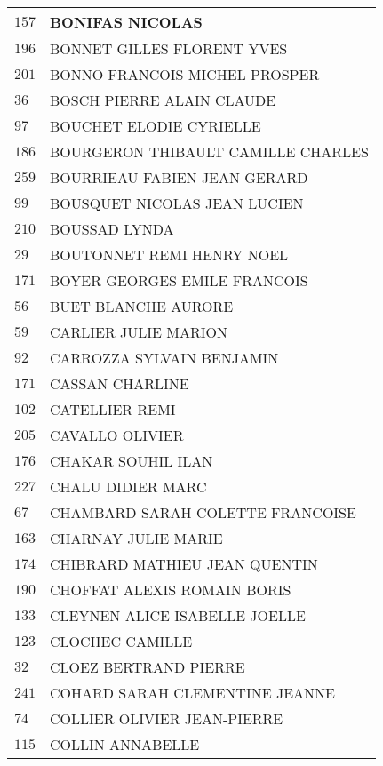 \begin{xltabular}{\linewidth}{|l|X|}
    \hline
    $157$ & BONIFAS NICOLAS \\
    \hline
    $196$ & BONNET GILLES FLORENT YVES \\
    \hline
    $201$ & BONNO FRANCOIS MICHEL PROSPER \\
    \hline
    $36$ & BOSCH PIERRE ALAIN CLAUDE \\
    \hline
    $97$ & BOUCHET ELODIE CYRIELLE \\
    \hline
    $186$ & BOURGERON THIBAULT CAMILLE CHARLES \\
    \hline
    $259$ & BOURRIEAU FABIEN JEAN GERARD \\
    \hline
    $99$ & BOUSQUET NICOLAS JEAN LUCIEN \\
    \hline
    $210$ & BOUSSAD LYNDA \\
    \hline
    $29$ & BOUTONNET REMI HENRY NOEL \\
    \hline
    $171$ & BOYER GEORGES EMILE FRANCOIS \\
    \hline
    $56$ & BUET BLANCHE AURORE \\
    \hline
    $59$ & CARLIER JULIE MARION \\
    \hline
    $92$ & CARROZZA SYLVAIN BENJAMIN \\
    \hline
    $171$ & CASSAN CHARLINE \\
    \hline
    $102$ & CATELLIER REMI \\
    \hline
    $205$ & CAVALLO OLIVIER \\
    \hline
    $176$ & CHAKAR SOUHIL ILAN \\
    \hline
    $227$ & CHALU DIDIER MARC \\
    \hline
    $67$ & CHAMBARD SARAH COLETTE FRANCOISE \\
    \hline
    $163$ & CHARNAY JULIE MARIE \\
    \hline
    $174$ & CHIBRARD MATHIEU JEAN QUENTIN \\
    \hline
    $190$ & CHOFFAT ALEXIS ROMAIN BORIS \\
    \hline
    $133$ & CLEYNEN ALICE ISABELLE JOELLE \\
    \hline
    $123$ & CLOCHEC CAMILLE \\
    \hline
    $32$ & CLOEZ BERTRAND PIERRE \\
    \hline
    $241$ & COHARD SARAH CLEMENTINE JEANNE \\
    \hline
    $74$ & COLLIER OLIVIER JEAN-PIERRE \\
    \hline
    $115$ & COLLIN ANNABELLE \\
    \hline

\end{xltabular}
